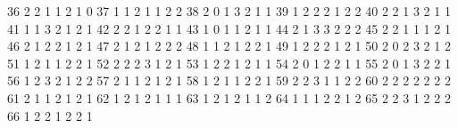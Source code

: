 \documentclass[
  letterpaper,
  DIV=11,
  numbers=noendperiod]{scrreprt}
\newenvironment{Shaded}{\begin{snugshade}}{\end{snugshade}}
\newcommand{\NormalTok}[1]{\textcolor[rgb]{0.00,0.23,0.31}{#1}}
\begin{document}
\begin{Shaded}
\begin{Highlighting}[]
\NormalTok{36               2     2         1            1        2         1      0}
\NormalTok{37               1     1         2            1        1         2      2}
\NormalTok{38               2     0         1            3        2         1      1}
\NormalTok{39               1     2         2            2        1         2      2}
\NormalTok{40               2     2         1            3        2         1      1}
\NormalTok{41               1     1         3            2        1         2      1}
\NormalTok{42               2     2         1            2        2         1      1}
\NormalTok{43               1     0         1            1        2         1      1}
\NormalTok{44               2     1         3            3        2         2      2}
\NormalTok{45               2     2         1            1        1         2      1}
\NormalTok{46               2     1         2            2        1         2      1}
\NormalTok{47               2     1         2            1        2         2      2}
\NormalTok{48               1     1         2            1        2         2      1}
\NormalTok{49               1     2         2            2        1         2      1}
\NormalTok{50               2     0         2            3        2         1      2}
\NormalTok{51               1     2         1            1        2         2      1}
\NormalTok{52               2     2         2            3        1         2      1}
\NormalTok{53               1     2         2            1        2         1      1}
\NormalTok{54               2     0         1            2        2         1      1}
\NormalTok{55               2     0         1            3        2         2      1}
\NormalTok{56               1     2         3            2        1         2      2}
\NormalTok{57               2     1         1            2        1         2      1}
\NormalTok{58               1     2         1            1        2         2      1}
\NormalTok{59               2     2         3            1        1         2      2}
\NormalTok{60               2     2         2            2        2         2      2}
\NormalTok{61               2     1         1            2        1         2      1}
\NormalTok{62               1     2         1            2        1         1      1}
\NormalTok{63               1     2         1            2        1         1      2}
\NormalTok{64               1     1         1            2        2         1      2}
\NormalTok{65               2     2         3            1        2         2      2}
\NormalTok{66               1     2         2            1        2         2      1}

\end{Highlighting}
\end{Shaded}
\end{document}
